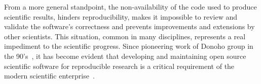 From a more general standpoint, the non-availability of the code
used to produce scientific results, hinders reproducibility,
makes it impossible to review and validate the software's correctness
and prevents improvements and extensions by other scientists.
This situation, common in many disciplines,
represents a real impediment to the scientific progress.
Since pioneering work of Donoho group in the 90's~\cite{Buckheit_1995},
it has become evident that developing and maintaining open source scientific software
for reproducible research is a critical requirement of the modern
scientific enterprise~\cite{Ince_2012,Vihinen_2015}.


